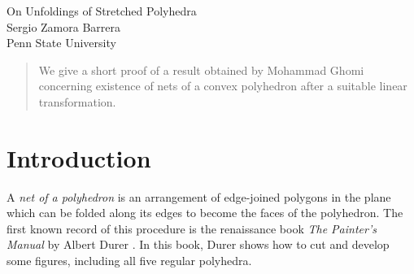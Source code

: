 \documentclass[openright, 12pt]{article}
\newcommand{\field}[1]{\ensuremath{\mathbb{#1}}}
\newcommand{\R}{\field{R}}
\begin{document}
\begin{center}
\Large{On Unfoldings of Stretched Polyhedra}\\
\normalsize{ Sergio Zamora Barrera}\\
Penn State University
\end{center}



\begin{abstract}
\noindent We give a short proof of a result obtained by Mohammad Ghomi concerning existence of nets of a convex polyhedron after a suitable linear transformation.

\end{abstract}


\section*{Introduction}


A \textit{net of a polyhedron} is an arrangement of edge-joined polygons in the plane which can be folded along its edges to become the faces of the polyhedron. The first known record of this procedure is the renaissance book \textit{The Painter's Manual} by Albert Durer \cite{Du}. In this book, Durer shows how to cut and develop some figures, including all five regular polyhedra.  


\end{document}
